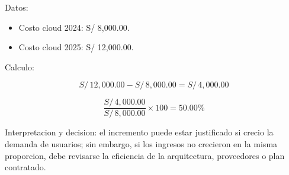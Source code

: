 Datos:

\begin{itemize}
  \item Costo cloud 2024: S/ 8,000.00.
  \item Costo cloud 2025: S/ 12,000.00.
\end{itemize}

Calculo:

\[
S/\,12,000.00 - S/\,8,000.00 = S/\,4,000.00
\]

\[
\frac{S/\,4,000.00}{S/\,8,000.00} \times 100 = 50.00\%
\]

Interpretacion y decision: el incremento puede estar justificado si crecio la demanda de usuarios; sin embargo, si los ingresos no crecieron en la misma proporcion, debe revisarse la eficiencia de la arquitectura, proveedores o plan contratado.
